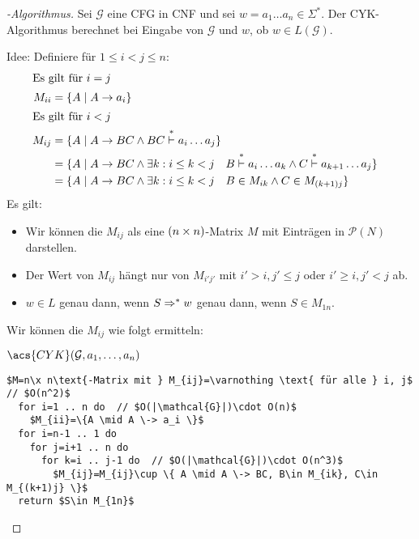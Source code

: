 \begin{proof}[-Algorithmus] Sei $\mathcal{G}$ eine \ac{CFG} in \ac{CNF} und sei $w = a_1\dots a_n\in\Sigma^*$.
Der \ac{CYK}-Algorithmus berechnet bei Eingabe von $\mathcal{G}$ und $w$, ob $w\in L(\mathcal{G})$.

Idee: Definiere für $1\leq i < j\leq n$:
	\begin{align*}
	\intertext{Es gilt für $i=j$}
		M_{ii} &= \{A \mid A\-> a_i \} \\
	\intertext{Es gilt für $i<j$}
		M_{ij} &= \{ A \mid A\-> BC \land BC \stackrel{*}{\vdash} a_i\dots a_j \}\\
		&= \{ A \mid A\-> BC \land \exists k: i\leq k<j\quad 
			\begin{aligned}[t]
				B &\stackrel{*}{\vdash} a_i\dots a_k \land C \stackrel{*}{\vdash} a_{k+1}\dots a_j \}
			\end{aligned}\\
		&= \{ A \mid A\-> BC \land \exists k: i\leq k<j\quad B\in M_{ik} \land C \in M_{(k+1)j}\}
	\end{align*}
Es gilt:
\begin{itemize}
 \item Wir können die $M_{ij}$ als eine $(n\times n)$-Matrix $M$ mit Einträgen in $\mathcal{P}(N)$ darstellen.
 \item Der Wert von $M_{ij}$ hängt nur von $M_{i'j'}$ mit $i'>i, j'\leq j$ oder $i'\geq i,j'<j$ ab.
 \item $w\in L$ genau dann, wenn $S \=>^* w$ genau dann, wenn $S \in M_{1n}$.
\end{itemize}

Wir können die $M_{ij}$ wie folgt ermitteln:

$\acs{CYK}(\mathcal{G},a_1,\dots,a_n)$
\begin{lstlisting}[mathescape,morekeywords={for,do,return},morecomment={[l]{//}}]
  $M=n\x n\text{-Matrix mit } M_{ij}=\varnothing \text{ für alle } i, j$  // $O(n^2)$
  for i=1 .. n do  // $O(|\mathcal{G}|)\cdot O(n)$
    $M_{ii}=\{A \mid A \-> a_i \}$
  for i=n-1 .. 1 do
    for j=i+1 .. n do
      for k=i .. j-1 do  // $O(|\mathcal{G}|)\cdot O(n^3)$
        $M_{ij}=M_{ij}\cup \{ A \mid A \-> BC, B\in M_{ik}, C\in M_{(k+1)j} \}$
  return $S\in M_{1n}$
\end{lstlisting}
\qedherefixlstlisting
\end{proof}


